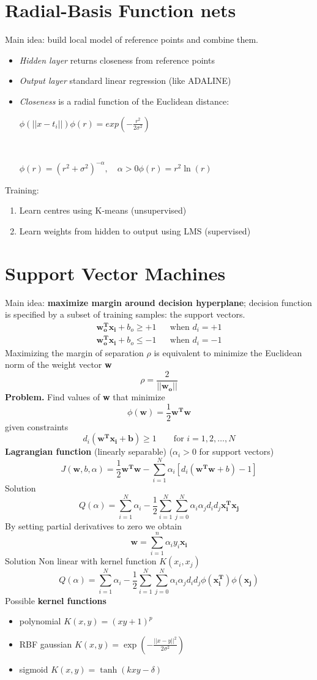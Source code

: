 \documentclass[11pt, twocolumn]{article}
\begin{document}
\section{Radial-Basis Function nets}
Main idea: build local model of reference points and combine them.
\begin{itemize}
	\item \emph{Hidden layer} returns closeness from reference points
	\item \emph{Output layer} standard linear regression (like ADALINE)
	\item \emph{Closeness} is a radial function of the Euclidean distance:\\
	\centerline{$\phi(||x-t_i||)$\qquad$\phi(r) = exp(-\frac{r^2}{2\sigma^2})$}\\
	\centerline{$\phi(r) = (r^2 + \sigma^2)^{-\alpha},\quad\alpha>0$\qquad$\phi(r) = r^2\ln(r)$}
\end{itemize}
Training:
\begin{enumerate}
	\item Learn centres using K-means (unsupervised)
	\item Learn weights from hidden to output using LMS (supervised)
\end{enumerate}

\section{Support Vector Machines}
Main idea: \textbf{maximize margin around decision hyperplane}; decision function is specified
by a subset of training samples: the support vectors.
\begin{align}
	\mathbf{w_o^Tx_i}+b_o\geq+1 && \mbox{when }d_i=+1 \\ 
	\mathbf{w_o^Tx_i}+b_o\leq-1 && \mbox{when }d_i=-1
\end{align}
Maximizing the margin of separation $\rho$ is equivalent to minimize the Euclidean norm of the weight vector \textbf{w}
$$\rho = \frac{2}{||\mathbf{w_o}||}$$
\textbf{Problem.} Find values of \textbf{w} that minimize
$$\phi(\mathbf{w}) = \frac{1}{2}\mathbf{w^Tw}$$
given constraints
$$d_i(\mathbf{w^Tx_i+b})\geq1\qquad\mbox{for }i=1,2,\dots,N$$
\textbf{Lagrangian function} (linearly separable) ($\alpha_i>0$ for support vectors)
$$J(\mathbf{w},b,\alpha)=\frac{1}{2}\mathbf{w^Tw}-\sum_{i=1}^{N}\alpha_i[d_i(\mathbf{w^Tw}+b)-1]$$
Solution
$$Q(\alpha)=\sum_{i=1}^N\alpha_i-\frac{1}{2}\sum_{i=1}^N\sum_{j=0}^N\alpha_i\alpha_jd_id_j\mathbf{x_i^Tx_j}$$
By setting partial derivatives to zero we obtain
$$\mathbf{w}=\sum_{i=1}^n \alpha_iy_i\mathbf{x_i}$$
Solution Non linear with kernel function $K(x_i,x_j)$
$$Q(\alpha)=\sum_{i=1}^N\alpha_i-\frac{1}{2}\sum_{i=1}^N\sum_{j=0}^N\alpha_i\alpha_jd_id_j\phi(\mathbf{x_i^T})\phi(\mathbf{x_j})$$
Possible \textbf{kernel functions}
\begin{itemize}
	\item polynomial $K(x,y)=(xy+1)^p$
	\item RBF gaussian $K(x,y)=\exp(-\frac{||x-y||^2}{2\sigma^2})$
	\item sigmoid $K(x,y)=\tanh(kxy-\delta)$
\end{itemize}
\end{document}
